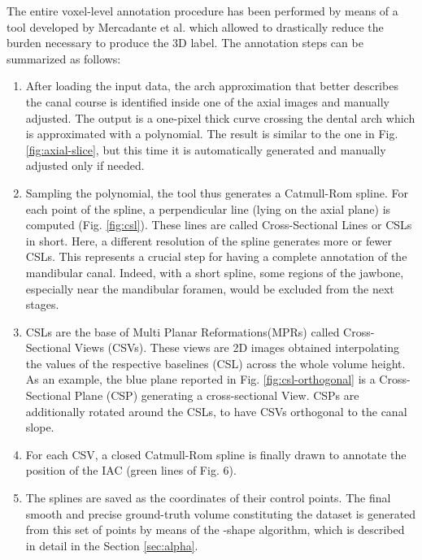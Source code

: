 The entire voxel-level annotation procedure has been performed by means of a
tool developed by Mercadante et al. which allowed to drastically reduce the
burden necessary to produce the 3D label.
The annotation steps can be summarized as follows:
\begin{enumerate}
  \item{After loading the input data, the arch approximation that better
    describes the canal course is identified inside one of the axial images and
    manually adjusted. The output is a one-pixel thick curve crossing the dental
    arch which is approximated with a polynomial. The result is similar to the
    one in Fig. \ref{fig:axial-slice}, but this time it is automatically
    generated and manually adjusted only if needed.}

  \item{Sampling the polynomial, the tool thus generates a Catmull-Rom spline.
    For each point of the spline, a perpendicular line (lying on the axial
    plane) is computed (Fig. \ref{fig:csl}). These lines are called
    Cross-Sectional Lines or CSLs in short. Here, a different resolution of the
    spline generates more or fewer CSLs. This represents a crucial step for
    having a complete annotation of the mandibular canal. Indeed, with a short
    spline, some regions of the jawbone, especially near the mandibular foramen,
    would be excluded from the next stages.}

  \item{CSLs are the base of Multi Planar Reformations(MPRs) called
    Cross-Sectional Views (CSVs). These views are 2D images obtained
    interpolating the values of the respective baselines (CSL) across the whole
    volume height. As an example, the blue plane reported in Fig.
    \ref{fig:csl-orthogonal} is a Cross-Sectional Plane (CSP) generating a
    cross-sectional View. CSPs are additionally rotated around the CSLs, to have
    CSVs orthogonal to the canal slope.}

  \item{For each CSV, a closed Catmull-Rom spline is finally drawn to annotate
    the position of the IAC (green lines of Fig. 6).}

  \item{The splines are saved as the coordinates of their control points. The
    final smooth and precise ground-truth volume constituting the dataset is
    generated from this set of points by means of the \textalpha-shape
    algorithm, which is described in detail in the Section \ref{sec:alpha}.}
\end{enumerate}

